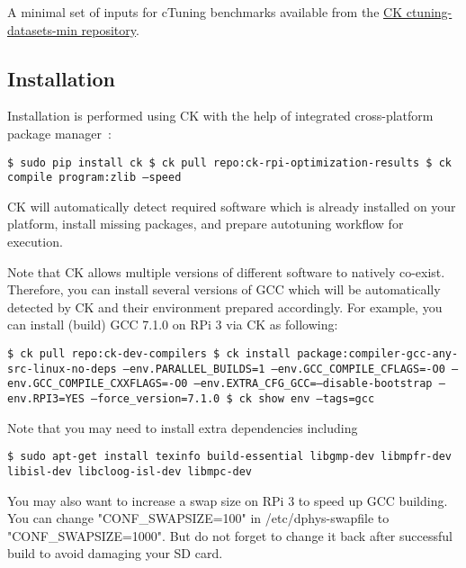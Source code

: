 A minimal set of inputs for cTuning benchmarks available from the \href{https://github.com/ctuning/ctuning-datasets-min}{CK ctuning-datasets-min repository}.

\subsection{Installation}

Installation is performed using CK with the help of integrated cross-platform package manager~\cite{ck-env}:

\begin{flushleft}
\texttt{\$ sudo pip install ck \newline
\$ ck pull repo:ck-rpi-optimization-results \newline
\$ ck compile program:zlib --speed \newline}
\end{flushleft}

CK will automatically detect required software which is already installed on your platform, 
install missing packages, and prepare autotuning workflow for execution.

Note that CK allows multiple versions of different software to natively co-exist.
%
Therefore, you can install several versions of GCC which will be automatically
detected by CK and their environment prepared accordingly.
%
For example, you can install (build) GCC 7.1.0 on RPi 3 via CK as following:

\begin{flushleft}
\texttt{\$ ck pull repo:ck-dev-compilers \newline
\$ ck install package:compiler-gcc-any-src-linux-no-deps --env.PARALLEL\_BUILDS=1 --env.GCC\_COMPILE\_CFLAGS=-O0 --env.GCC\_COMPILE\_CXXFLAGS=-O0 --env.EXTRA\_CFG\_GCC=--disable-bootstrap --env.RPI3=YES --force\_version=7.1.0 \newline
\$ ck show env --tags=gcc}
\end{flushleft}

Note that you may need to install extra dependencies including

\begin{flushleft}
\texttt{\$ sudo apt-get install texinfo build-essential libgmp-dev libmpfr-dev libisl-dev libcloog-isl-dev libmpc-dev}
\end{flushleft}

You may also want to increase a swap size on RPi 3 to speed up GCC building. 
You can change "CONF\_SWAPSIZE=100" in /etc/dphys-swapfile to "CONF\_SWAPSIZE=1000". 
But do not forget to change it back after successful build to avoid damaging your SD card.

